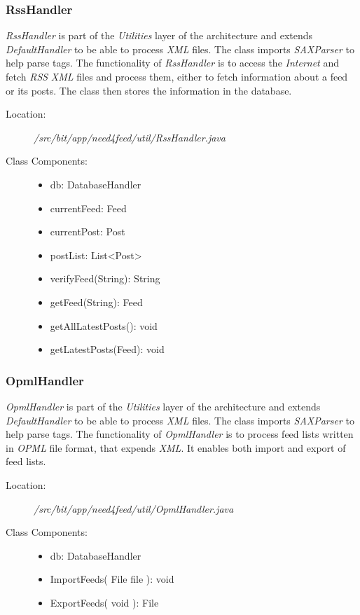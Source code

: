 \subsubsection{RssHandler}
\textit{RssHandler} is part of the \textit{Utilities} layer of the architecture and extends \textit{DefaultHandler} to be able to process \textit{XML} files. The class imports \textit{SAXParser} to help parse tags. The functionality of \textit{RssHandler} is to access the \textit{Internet} and fetch \textit{RSS} \textit{XML} files and process them, either to fetch information about a feed or its posts. The class then stores the information in the database.
\begin{description}
  \item[Location:] \textit{/src/bit/app/need4feed/util/RssHandler.java} \hfill
  \item[Class Components:] \hfill
     \begin{itemize}
        \item db: DatabaseHandler
        \item currentFeed: Feed
        \item currentPost: Post
        \item postList: List\textless Post\textgreater
		\item verifyFeed(String): String 
		\item getFeed(String): Feed
		\item getAllLatestPosts(): void
		\item getLatestPosts(Feed): void
     \end{itemize}
\end{description}


\subsubsection{OpmlHandler}
\textit{OpmlHandler} is part of the \textit{Utilities} layer of the architecture and extends \textit{DefaultHandler} to be able to process \textit{XML} files. The class imports \textit{SAXParser} to help parse tags. The functionality of \textit{OpmlHandler} is to process feed lists written in \textit{OPML} file format, that expends \textit{XML}. It enables both import and export of feed lists.
\begin{description}
  \item[Location:] \textit{/src/bit/app/need4feed/util/OpmlHandler.java} \hfill
  \item[Class Components:] \hfill
     \begin{itemize}
        \item db: DatabaseHandler
		\item ImportFeeds( File file ): void
		\item ExportFeeds( void ): File
     \end{itemize}
\end{description}


